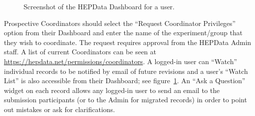 \documentclass[a4paper]{jpconf}
\begin{document}
\begin{figure}
  \begin{center}
  \end{center}
  \caption{\label{fig:dashboard}Screenshot of the HEPData Dashboard for a user.}
\end{figure}
%
Prospective Coordinators should select the ``Request Coordinator Privileges''
option from their Dashboard and enter the name of the experiment/group that
they wish to coordinate.  The request requires approval from the HEPData Admin
staff.  A list of current Coordinators can be seen at
\url{https://hepdata.net/permissions/coordinators}.  A logged-in user can
``Watch'' individual records to be notified by email of future revisions and a
user's ``Watch List'' is also accessible from their Dashboard; see
figure~\ref{fig:dashboard}.  An ``Ask a Question'' widget on each record allows
any logged-in user to send an email to the submission participants (or to the
Admin for migrated records) in order to point out mistakes or ask for
clarifications.
\end{document}
